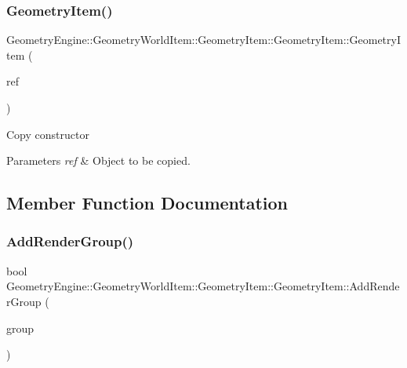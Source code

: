 \subsubsection{\texorpdfstring{GeometryItem()}{GeometryItem()}\hspace{0.1cm}{\footnotesize\ttfamily [2/2]}}
{\footnotesize\ttfamily Geometry\+Engine\+::\+Geometry\+World\+Item\+::\+Geometry\+Item\+::\+Geometry\+Item\+::\+Geometry\+Item (\begin{DoxyParamCaption}\item[{const \mbox{\hyperlink{class_geometry_engine_1_1_geometry_world_item_1_1_geometry_item_1_1_geometry_item}{Geometry\+Item}} \&}]{ref }\end{DoxyParamCaption})}

Copy constructor 
\begin{DoxyParams}{Parameters}
{\em ref} & Object to be copied. \\
\hline
\end{DoxyParams}


\subsection{Member Function Documentation}
\mbox{\label{class_geometry_engine_1_1_geometry_world_item_1_1_geometry_item_1_1_geometry_item_adff9d0c0188f96abdbbec182ac1901d8}} 
\subsubsection{\texorpdfstring{AddRenderGroup()}{AddRenderGroup()}}
{\footnotesize\ttfamily bool Geometry\+Engine\+::\+Geometry\+World\+Item\+::\+Geometry\+Item\+::\+Geometry\+Item\+::\+Add\+Render\+Group (\begin{DoxyParamCaption}\item[{int}]{group }\end{DoxyParamCaption})\hspace{0.3cm}{\ttfamily [virtual]}}

